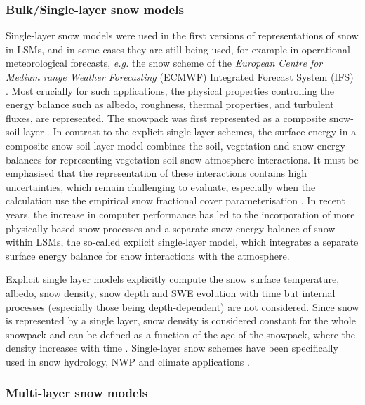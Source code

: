 \documentclass[utf8]{frontiersSCNS} %
\begin{document}
\subsubsection{Bulk/Single-layer snow models}

Single-layer snow models were used in the first versions of representations of snow in LSMs, and in some cases they are still being used, for example in operational meteorological forecasts, \textit{e.g.} the snow scheme of the \textit{European Centre for Medium range Weather Forecasting} (ECMWF) Integrated Forecast System (IFS) \citep{Dutra_2010}. Most crucially for such applications, the physical properties controlling the energy balance such as albedo, roughness, thermal properties, and turbulent fluxes, are represented. The snowpack was first represented as a composite snow-soil layer \citep{Pitman_1991,Douville_1995,Yang_1997}. In contrast to the explicit single layer schemes, the surface energy in a composite snow-soil layer model combines the soil, vegetation and snow energy balances for representing vegetation-soil-snow-atmosphere interactions. It must be emphasised that the representation of these interactions contains high uncertainties, which remain challenging to evaluate, especially when the calculation use the empirical snow fractional cover parameterisation \citep{Boone_2017,Rutter_2009}. In recent years, the increase in computer performance has led to the incorporation of more physically-based snow processes and a separate snow energy balance of snow within LSMs, the so-called explicit single-layer model, which integrates a separate surface energy balance for snow interactions with the atmosphere. 

Explicit single layer models explicitly compute the snow surface temperature, albedo, snow density, snow depth and SWE evolution with time but internal processes (especially those being depth-dependent) are not considered. Since snow is represented by a single layer, snow density is considered constant for the whole snowpack \citep{Chalita_1994,Gouttevin_2012} and can be defined as a function of the age of the snowpack, where the density increases with time \citep{Douville_1995}. Single-layer snow schemes have been specifically used in snow hydrology, NWP and climate applications \citep{Dutra_2012,Lehning_2006}. 


\subsubsection{Multi-layer snow models}\label{multilayer}
\end{document}

